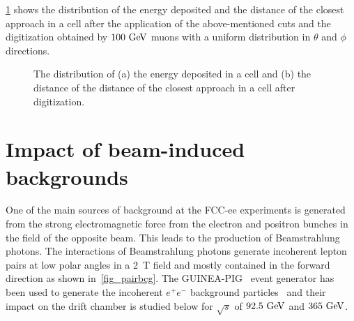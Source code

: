 \documentclass{article}
\begin{document}
\cref{fig_DCA_Edep} shows the distribution of the energy deposited and the distance of the closest approach in a cell after the application of the above-mentioned cuts and the digitization obtained by $100\,\mathrm{\,Ge\kern -0.1em V}$ muons with a uniform distribution in $\theta$ and $\phi$ directions.

\begin{figure}[!h]
\hfil
{}
\caption{The distribution of (a) the energy deposited in a cell and (b) the distance of the distance of the closest approach in a cell after digitization.}
\label{fig_DCA_Edep}
\end{figure}

\section{Impact of beam-induced backgrounds}
One of the main sources of background at the FCC-ee experiments is generated from the strong electromagnetic force from the electron and positron bunches in the field of the opposite beam. This leads to the production of Beamstrahlung photons. The interactions of Beamstrahlung photons generate incoherent lepton pairs at low polar angles in a 2~T field and mostly contained in the forward direction as shown in~\cref{fig_pairbcg}. The \textsc{GUINEA-PIG}~\cite{Schulte:382453} event generator has been used to generate the incoherent $e^+e^-$ background particles~\cite{Voutsinas:2017eca} and their impact on the drift chamber is studied below for $\sqrt{s}$ of $92.5\,\mathrm{\,Ge\kern -0.1em V}$ and $365\,\mathrm{\,Ge\kern -0.1em V}$.
\end{document}
